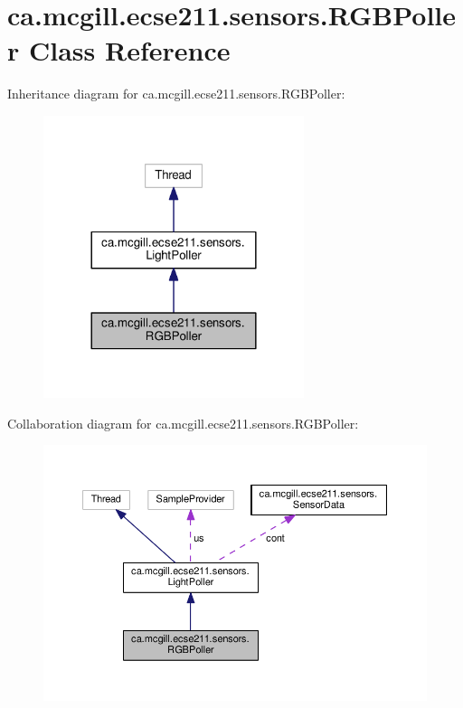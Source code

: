 \hypertarget{classca_1_1mcgill_1_1ecse211_1_1sensors_1_1_r_g_b_poller}{}\section{ca.\+mcgill.\+ecse211.\+sensors.\+R\+G\+B\+Poller Class Reference}
\label{classca_1_1mcgill_1_1ecse211_1_1sensors_1_1_r_g_b_poller}


Inheritance diagram for ca.\+mcgill.\+ecse211.\+sensors.\+R\+G\+B\+Poller\+:\nopagebreak
\begin{figure}[H]
\begin{center}
\leavevmode
\includegraphics[width=216pt]{classca_1_1mcgill_1_1ecse211_1_1sensors_1_1_r_g_b_poller__inherit__graph}
\end{center}
\end{figure}


Collaboration diagram for ca.\+mcgill.\+ecse211.\+sensors.\+R\+G\+B\+Poller\+:\nopagebreak
\begin{figure}[H]
\begin{center}
\leavevmode
\includegraphics[width=350pt]{classca_1_1mcgill_1_1ecse211_1_1sensors_1_1_r_g_b_poller__coll__graph}
\end{center}
\end{figure}
